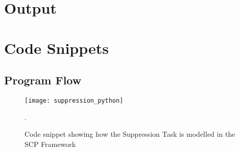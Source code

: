 \section{Output}


\section{Code Snippets}
\subsection{Program Flow}
\begin{figure}
\centering \texttt{[image: suppression\_python]}
\caption{Code snippet showing how the Suppression Task is modelled in the SCP Framework}.
\label{fig:suppression_python}
\end{figure}

